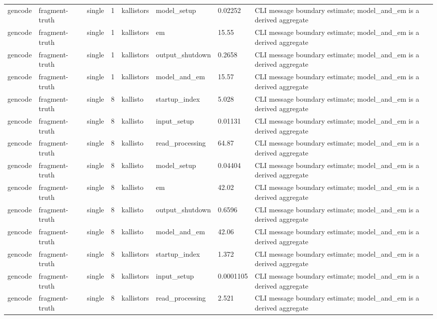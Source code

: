 \begin{tabular}{llllllll}
gencode & fragment-truth & single & 1 & kallistors & model\_setup & 0.02252 & CLI message boundary estimate; model\_and\_em is a derived aggregate \\
gencode & fragment-truth & single & 1 & kallistors & em & 15.55 & CLI message boundary estimate; model\_and\_em is a derived aggregate \\
gencode & fragment-truth & single & 1 & kallistors & output\_shutdown & 0.2658 & CLI message boundary estimate; model\_and\_em is a derived aggregate \\
gencode & fragment-truth & single & 1 & kallistors & model\_and\_em & 15.57 & CLI message boundary estimate; model\_and\_em is a derived aggregate \\
gencode & fragment-truth & single & 8 & kallisto & startup\_index & 5.028 & CLI message boundary estimate; model\_and\_em is a derived aggregate \\
gencode & fragment-truth & single & 8 & kallisto & input\_setup & 0.01131 & CLI message boundary estimate; model\_and\_em is a derived aggregate \\
gencode & fragment-truth & single & 8 & kallisto & read\_processing & 64.87 & CLI message boundary estimate; model\_and\_em is a derived aggregate \\
gencode & fragment-truth & single & 8 & kallisto & model\_setup & 0.04404 & CLI message boundary estimate; model\_and\_em is a derived aggregate \\
gencode & fragment-truth & single & 8 & kallisto & em & 42.02 & CLI message boundary estimate; model\_and\_em is a derived aggregate \\
gencode & fragment-truth & single & 8 & kallisto & output\_shutdown & 0.6596 & CLI message boundary estimate; model\_and\_em is a derived aggregate \\
gencode & fragment-truth & single & 8 & kallisto & model\_and\_em & 42.06 & CLI message boundary estimate; model\_and\_em is a derived aggregate \\
gencode & fragment-truth & single & 8 & kallistors & startup\_index & 1.372 & CLI message boundary estimate; model\_and\_em is a derived aggregate \\
gencode & fragment-truth & single & 8 & kallistors & input\_setup & 0.0001105 & CLI message boundary estimate; model\_and\_em is a derived aggregate \\
gencode & fragment-truth & single & 8 & kallistors & read\_processing & 2.521 & CLI message boundary estimate; model\_and\_em is a derived aggregate \\

\end{tabular}
